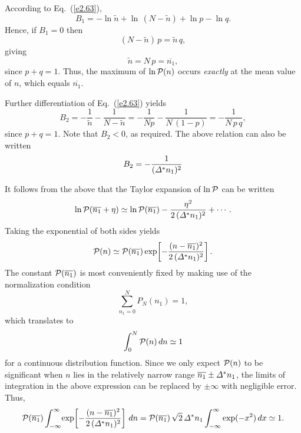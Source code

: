 According to Eq.~(\ref{e2.63}),
\begin{equation}
B_1 = -\ln\tilde{n} +\ln\,(N-\tilde{n})+\ln p - \ln q.
\end{equation}
Hence, if $B_1=0$ then
\begin{equation}
(N-\tilde{n})\, p = \tilde{n}\,q,
\end{equation}
giving 
\begin{equation}
\tilde{n} = N\,p = \overline{n_1},
\end{equation}
since $p+q=1$. Thus, the maximum of $\ln{\cal P}(n)$ occurs {\em exactly}
at the mean value of $n$, which equals $\overline{n_1}$.

Further differentiation of Eq.~(\ref{e2.63}) yields
\begin{equation}
B_2 = -\frac{1}{\tilde{n}}-\frac{1}{N-\tilde{n}} =
-\frac{1}{Np}-\frac{1}{N\,(1-p)}= - \frac{1}{N\,p\,q},
\end{equation}
since $p+q=1$. Note that $B_2<0$, as required. The above relation
can also be written
\begin{equation}
B_2 = -\frac{1}{({\mit\Delta}^\ast n_1)^2}
\end{equation}


It follows from the above that the Taylor expansion of $\ln {\cal P}$ can be written
\begin{equation}
\ln{\cal P}(\overline{n_1}+\eta) \simeq \ln{\cal P}(\overline{n_1}) - 
\frac{\eta^2}{2\,({\mit\Delta}^\ast n_1)^2} +\cdots.
\end{equation}
Taking the exponential of both sides yields
\begin{equation}
{\cal P}(n)\simeq {\cal P}(\overline{n_1})\exp\!\left[-
\frac{(n-\overline{n_1})^2}{2\,({\mit\Delta}^\ast n_1)^2}\right].
\end{equation}
The constant ${\cal P}(\overline{n_1})$ is most conveniently
 fixed by making use
of the normalization condition
\begin{equation}
\sum_{n_1=0}^N P_N(n_1)=1,
\end{equation}
which translates to
\begin{equation}
\int_0^N {\cal P}(n)\,dn \simeq 1
\end{equation}
for a continuous distribution function. Since we only expect
${\cal P}(n)$ to be significant when
 $n$ lies in the relatively narrow range
$\overline{n_1}\pm {\mit\Delta}^\ast n_1$, the limits of integration in the above
expression can be replaced by $\pm \infty$ with negligible error.
Thus,
\begin{equation}
{\cal P}(\overline{n_1})\int_{-\infty}^{\infty}\!\exp\!
\left[-\frac{(n-\overline{n_1})^2}{2\,({\mit\Delta}^\ast n_1)^2}
\right]\,dn
= {\cal P}(\overline{n_1})
\,\sqrt{2}\,{\mit\Delta}^\ast n_1\int_{-\infty}^{\infty}
\exp(-x^2)\,dx\simeq 1.\label{e2.76}
\end{equation}

